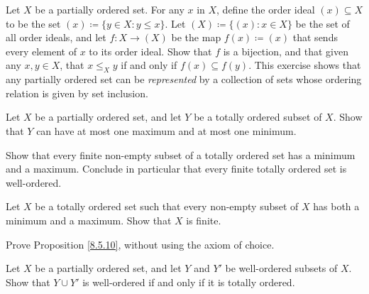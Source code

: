 \begin{exercise}\label{ex 8.5.6}
    Let \(X\) be a partially ordered set.
    For any \(x\) in \(X\), define the order ideal \((x) \subseteq X\) to be the set \((x) \coloneqq \{y \in X : y \leq x\}\).
    Let \((X) \coloneqq \{(x) : x \in X\}\) be the set of all order ideals, and let \(f : X \to (X)\) be the map \(f(x) \coloneqq (x)\) that sends every element of \(x\) to its order ideal.
    Show that \(f\) is a bijection, and that given any \(x, y \in X\), that \(x \leq_X y\) if and only if \(f(x) \subseteq f(y)\).
    This exercise shows that any partially ordered set can be \emph{represented} by a collection of sets whose ordering relation is given by set inclusion.
\end{exercise}

\begin{exercise}\label{ex 8.5.7}
    Let \(X\) be a partially ordered set, and let \(Y\) be a totally ordered subset of \(X\).
    Show that \(Y\) can have at most one maximum and at most one minimum.
\end{exercise}

\begin{exercise}\label{ex 8.5.8}
    Show that every finite non-empty subset of a totally ordered set has a minimum and a maximum.
    Conclude in particular that every finite totally ordered set is well-ordered.
\end{exercise}

\begin{exercise}\label{ex 8.5.9}
    Let \(X\) be a totally ordered set such that every non-empty subset of \(X\) has both a minimum and a maximum.
    Show that \(X\) is finite.
\end{exercise}

\begin{exercise}\label{ex 8.5.10}
    Prove Proposition \ref{8.5.10}, without using the axiom of choice.
\end{exercise}

\begin{exercise}\label{ex 8.5.11}
    Let \(X\) be a partially ordered set, and let \(Y\) and \(Y'\) be well-ordered subsets of \(X\).
    Show that \(Y \cup Y'\) is well-ordered if and only if it is totally ordered.
\end{exercise}

